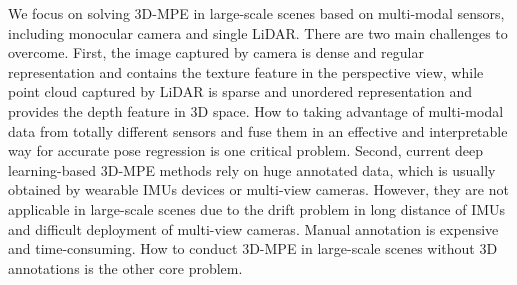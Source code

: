 \documentclass[letterpaper]{article} %
\begin{document}
We focus on solving 3D-MPE in large-scale scenes based on multi-modal sensors, including monocular camera and single LiDAR. There are two main challenges to overcome. First, the image captured by camera is dense and regular representation and contains the texture feature in the perspective view, while point cloud captured by LiDAR is sparse and unordered representation and provides the depth feature in 3D space. How to taking advantage of multi-modal data from totally different sensors and fuse them in an effective and interpretable way for accurate pose regression is one critical problem. Second, current deep learning-based 3D-MPE methods rely on huge annotated data, which is usually obtained by wearable IMUs devices or multi-view cameras. However, they are not applicable in large-scale scenes due to the drift problem in long distance of IMUs and difficult deployment of multi-view cameras. Manual annotation is expensive and time-consuming. How to conduct 3D-MPE in large-scale scenes without 3D annotations is the other core problem.
\end{document}
